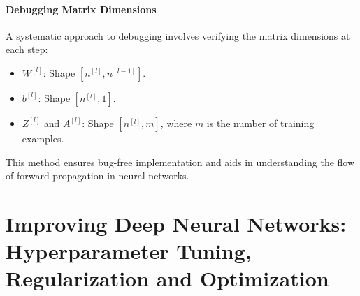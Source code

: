 \documentclass[letterpaper,12pt,notitlepage,twoside]{report}
\begin{document}
\subsubsection*{Debugging Matrix Dimensions}

A systematic approach to debugging involves verifying the matrix dimensions at each step:
\begin{itemize}
    \item \( W^{[l]} \): Shape \( [n^{[l]}, n^{[l-1]}] \).
    \item \( b^{[l]} \): Shape \( [n^{[l]}, 1] \).
    \item \( Z^{[l]} \) and \( A^{[l]} \): Shape \( [n^{[l]}, m] \), where \( m \) is the number of training examples.
\end{itemize}

This method ensures bug-free implementation and aids in understanding the flow of forward propagation in neural networks.




\chapter{Improving Deep Neural Networks: Hyperparameter Tuning, Regularization and Optimization} \label{ch:2}
\end{document}

